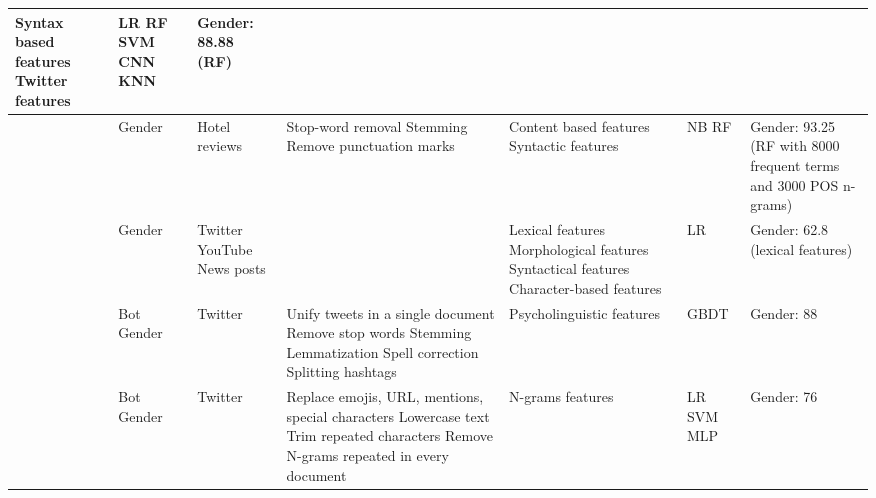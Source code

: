 \begin{longtable}{ p{} p{} p{} p{} p{} p{} p{}}
\newline Syntax based features
\newline Twitter features
& \acrshort{LR}
\newline \acrshort{RF}
\newline \acrshort{SVM}
\newline \acrshort{CNN}
\newline \acrshort{KNN}
& Gender: 88.88 (RF)
\\
\hline
\cite{raghunadha2020author} 
& Gender
& Hotel reviews 
& Stop-word removal
\newline Stemming
\newline Remove punctuation marks
& Content based features
\newline Syntactic features
& \acrshort{NB}
\newline \acrshort{RF}
& Gender: 93.25 (RF with 8000 frequent terms and 3000 POS n-grams)
\\
\hline
\cite{escobar2021gender} 
& Gender
& Twitter
\newline YouTube
\newline News posts
& 
& Lexical features
\newline Morphological features
\newline Syntactical features
\newline Character-based features
& \acrshort{LR}
& Gender: 62.8 (lexical features)
\\
\hline
\cite{joo2019author} 
& Bot
\newline Gender
& Twitter
& Unify tweets in a single document
\newline Remove stop words
\newline Stemming
\newline Lemmatization
\newline Spell correction
\newline Splitting hashtags
& Psycholinguistic features
& \acrshort{GBDT}
& Gender: 88
\\
\hline
\cite{valencia2019bots} 
& Bot
\newline Gender
& Twitter
& Replace emojis, URL, mentions, special characters
\newline Lowercase text
\newline Trim repeated characters
\newline Remove N-grams repeated in every document
& N-grams features
& \acrshort{LR}
\newline \acrshort{SVM}
\newline \acrshort{MLP}
& Gender: 76
\\

\end{longtable}
